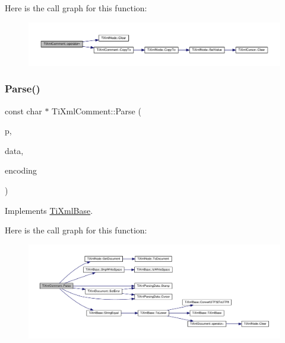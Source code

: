 Here is the call graph for this function\+:\nopagebreak
\begin{figure}[H]
\begin{center}
\leavevmode
\includegraphics[width=350pt]{class_ti_xml_comment_aeceedc15f8b8f9ca0b6136696339b3ac_cgraph}
\end{center}
\end{figure}
\mbox{\label{class_ti_xml_comment_a43bddc18ac057734b41d84653b71d3e0}} 
\subsubsection{\texorpdfstring{Parse()}{Parse()}}
{\footnotesize\ttfamily const char $\ast$ Ti\+Xml\+Comment\+::\+Parse (\begin{DoxyParamCaption}\item[{const char $\ast$}]{p,  }\item[{\hyperlink{class_ti_xml_parsing_data}{Ti\+Xml\+Parsing\+Data} $\ast$}]{data,  }\item[{\hyperlink{tinyxml_8h_a88d51847a13ee0f4b4d320d03d2c4d96}{Ti\+Xml\+Encoding}}]{encoding }\end{DoxyParamCaption})\hspace{0.3cm}{\ttfamily [virtual]}}



Implements \hyperlink{class_ti_xml_base_a00e4edb0219d00a1379c856e5a1d2025}{Ti\+Xml\+Base}.

Here is the call graph for this function\+:\nopagebreak
\begin{figure}[H]
\begin{center}
\leavevmode
\includegraphics[width=350pt]{class_ti_xml_comment_a43bddc18ac057734b41d84653b71d3e0_cgraph}
\end{center}
\end{figure}
\mbox{\label{class_ti_xml_comment_a873171beac19d40f0eaae945711c98ed}} 
